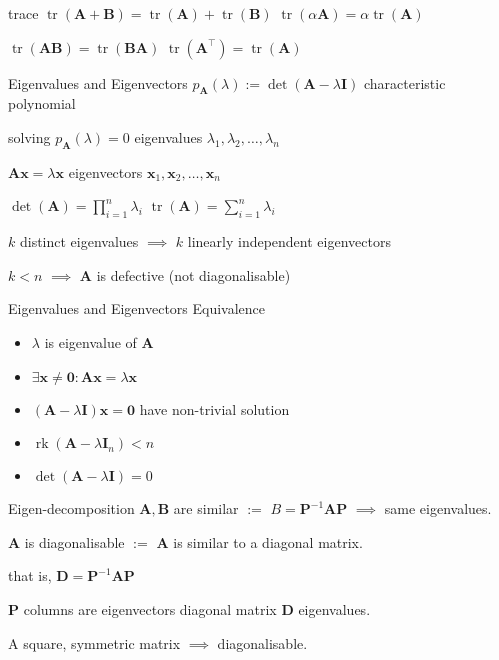 \documentclass[UTF8,a4paper]{article}
\begin{document}
\begin{cheatsheetblock}{trace}
    $\operatorname{tr}(\bm{A}+\bm{B})=\operatorname{tr}(\bm{A})+\operatorname{tr}(\bm{B})$ \hfill $\operatorname{tr}(\alpha \bm{A})=\alpha \operatorname{tr}(\bm{A})$

    $\operatorname{tr}(\bm{A} \bm{B})=\operatorname{tr}(\bm{B} \bm{A})$ \hfill $\operatorname{tr}(\bm{A}^{\top})=\operatorname{tr}(\bm{A})$
\end{cheatsheetblock}

\begin{cheatsheetblock}{Eigenvalues and Eigenvectors}
    $p_{\bm{A}}(\lambda):=\det(\bm{A}-\lambda \bm{I})$ \hfill characteristic polynomial

    solving $p_{\bm{A}}(\lambda)=0$ \hfill eigenvalues $\lambda_1, \lambda_2, \ldots, \lambda_n$

    $\bm{A}\bm{x} = \lambda \bm{x}$ \hfill eigenvectors $\bm{x}_1, \bm{x}_2, \ldots, \bm{x}_n$

    $\det(\bm{A}) = \prod_{i=1}^n \lambda_i$ \hfill $\operatorname{tr}(\bm{A}) = \sum_{i=1}^n \lambda_i$

    $k$ distinct eigenvalues $\implies$ $k$ linearly independent eigenvectors

    $k < n$ $\implies$ $\bm{A}$ is defective (not diagonalisable)
\end{cheatsheetblock}

\begin{cheatsheetblock}{Eigenvalues and Eigenvectors Equivalence}
    \begin{itemize}
        \item $\lambda$ is eigenvalue of $\bm{A}$
        \item $\exists \bm{x} \neq \bm{0}: \bm{A} \bm{x} = \lambda \bm{x}$
        \item $(\bm{A} - \lambda \bm{I}) \bm{x} = \bm{0}$ have non-trivial solution
        \item $\operatorname{rk}(\bm{A} - \lambda \bm{I}_n) < n$
        \item $\det (\bm{A} - \lambda \bm{I}) = 0$
    \end{itemize}
\end{cheatsheetblock}

\begin{cheatsheetblock}{Eigen-decomposition}
    $\bm{A}, \bm{B}$ are similar $:=$ $B = \bm{P}^{-1} \bm{A} \bm{P}$ \hfill $\implies$ \hfill same eigenvalues.

    $\bm{A}$ is diagonalisable $:=$ $\bm{A}$ is similar to a diagonal matrix.

    \hfill that is, $\bm{D} = \bm{P}^{-1} \bm{A} \bm{P}$

    $\bm{P}$ columns are eigenvectors \hfill diagonal matrix $\bm{D}$  eigenvalues.

    A square, symmetric matrix $\implies$ diagonalisable.
\end{cheatsheetblock}
\end{document}

